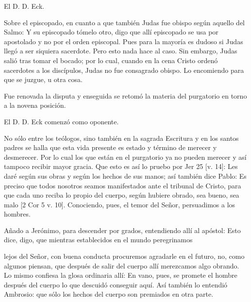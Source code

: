 El D. D. Eck.

Sobre el episcopado, en cuanto a que también Judas fue obispo según aquello del Salmo: Y su episcopado tómelo otro, digo que allí episcopado se usa por apostolado y no por el orden episcopal. Pues para la mayoría es dudoso si Judas llegó a ser siquiera sacerdote. Pero esto nada hace al caso. Sin embargo, Judas salió tras tomar el bocado; por lo cual, cuando en la cena Cristo ordenó sacerdotes a los discípulos, Judas no fue consagrado obispo. Lo encomiendo para que se juzgue, u otra cosa.

Fue renovada la disputa y enseguida se retomó la materia del purgatorio en torno a la novena posición.

El D. D. Eck comenzó como oponente.

No sólo entre los teólogos, sino también en la sagrada Escritura y en los santos padres se halla que esta vida presente es estado y término de merecer y desmerecer. Por lo cual los que están en el purgatorio ya no pueden merecer y así tampoco recibir mayor gracia. Que esto es así lo pruebo por Jer 25 [v. 14]: Les daré según sus obras y según los hechos de sus manos; así también dice Pablo: Es preciso que todos nosotros seamos manifestados ante el tribunal de Cristo, para que cada uno reciba lo propio del cuerpo, según hubiere obrado, sea bueno, sea malo [2 Cor 5 v. 10]. Conociendo, pues, el temor del Señor, persuadimos a los hombres.

Añado a Jerónimo, para descender por grados, entendiendo allí al apóstol: Esto dice, digo, que mientras establecidos en el mundo peregrinamos

lejos del Señor, con buena conducta procuremos agradarle en el futuro, no, como algunos piensan, que después de salir del cuerpo allí merezcamos algo obrando. Lo mismo confiesa la glosa ordinaria allí: En vano, pues, se promete el hombre después del cuerpo lo que descuidó conseguir aquí. Así también lo entendió Ambrosio: que sólo los hechos del cuerpo son premiados en otra parte.

